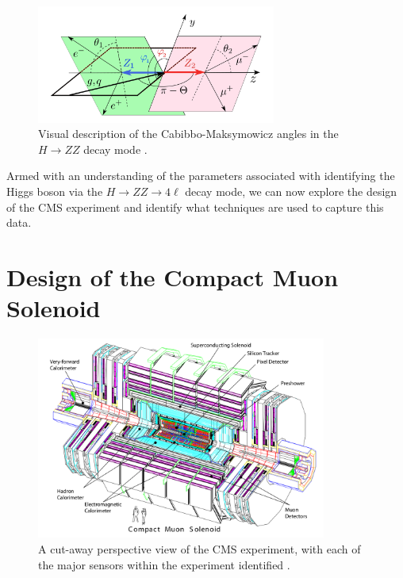 \documentclass[12pt]{article}
\begin{document}
\begin{figure}[h!]
\centering
\includegraphics[width=0.7\textwidth]{images/HtoZZ_angles}
\caption{Visual description of the Cabibbo-Maksymowicz angles in the $H \to ZZ$ decay mode \cite{higgs_angles}.}
\label{angle_fig}
\end{figure}
\noindent
Armed with an understanding of the parameters associated with identifying the Higgs boson via the $H \to ZZ \to 4 \ell$ decay mode, we can now explore the design of the CMS experiment and identify what techniques are used to capture this data.

\section{Design of the Compact Muon Solenoid}

\begin{figure}[H]
\centering
\includegraphics[width = 0.85\textwidth]{images/cms_persp}
\caption{A cut-away perspective view of the CMS experiment, with each of the major sensors within the experiment identified \cite{cms_design}.}
\label{cms_persp}
\end{figure}
\end{document}
